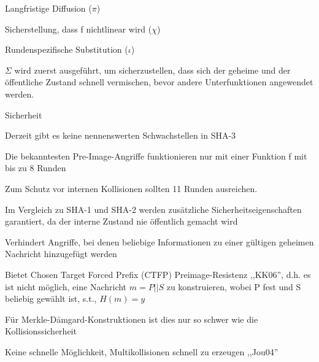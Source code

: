\documentclass[a4paper]{article}
\begin{document}
\begin{multicols}{3}
\begin{itemize*}
\begin{itemize*}
\begin{itemize*}
                        \item Langfristige Diffusion ($\pi$)
                        \item Sicherstellung, dass f nichtlinear wird ($\chi$)
                        \item Rundenspezifische Substitution ($\iota$)
                  \end{itemize*}
            \end{itemize*}
            \item $\Sigma$ wird zuerst ausgeführt, um sicherzustellen, dass sich der geheime und der öffentliche Zustand schnell vermischen, bevor andere Unterfunktionen angewendet werden.
            \item Sicherheit
            \begin{itemize*}
                  \item Derzeit gibt es keine nennenswerten Schwachstellen in SHA-3
                  \begin{itemize*}
                        \item Die bekanntesten Pre-Image-Angriffe funktionieren nur mit einer Funktion f mit bis zu 8 Runden
                        \item Zum Schutz vor internen Kollisionen sollten 11 Runden ausreichen.
                  \end{itemize*}
                  \item Im Vergleich zu SHA-1 und SHA-2 werden zusätzliche Sicherheitseigenschaften garantiert, da der interne Zustand nie öffentlich gemacht wird
                  \begin{itemize*}
                        \item Verhindert Angriffe, bei denen beliebige Informationen zu einer gültigen geheimen Nachricht hinzugefügt werden
                        \item Bietet Chosen Target Forced Prefix (CTFP) Preimage-Resistenz ,,KK06'', d.h. es ist nicht möglich, eine Nachricht $m=P|| S$ zu konstruieren, wobei P fest und S beliebig gewählt ist, s.t., $H(m)=y$
                        \item Für Merkle-Dåmgard-Konstruktionen ist dies nur so schwer wie die Kollisionssicherheit
                        \item Keine schnelle Möglichkeit, Multikollisionen schnell zu erzeugen ,,Jou04''
                  \end{itemize*}
            \end{itemize*}
      \end{itemize*}



\end{multicols}
\end{document}

